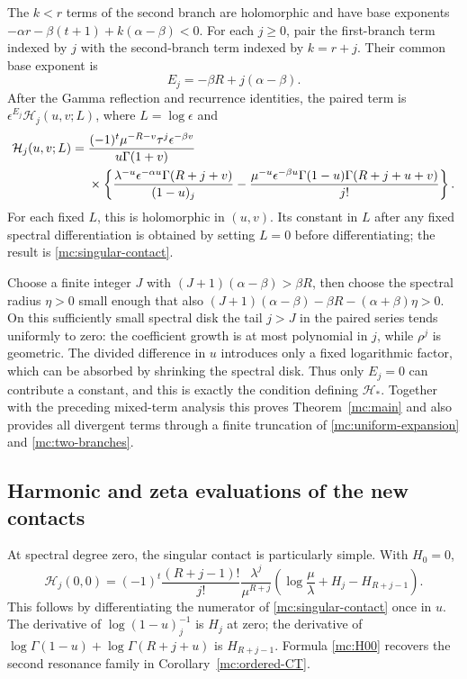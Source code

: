 The $k<r$ terms of the second branch are holomorphic and have
base exponents
$-\alpha r-\beta(t+1)+k(\alpha-\beta)<0$.
For each $j\ge0$, pair the first-branch term indexed by $j$ with
the second-branch term indexed by $k=r+j$. Their common base
exponent is
\begin{equation}\label{mc:paired-exponent}
                    E_j=-\beta R+j(\alpha-\beta).
\end{equation}
After the Gamma reflection and recurrence identities, the paired
term is $\epsilon^{E_j}\mathcal H_j(u,v;L)$, where $L=\log\epsilon$
and
\begin{align}\label{mc:H-log}
 \mathcal H_j(u,v;L)={}&
 \frac{(-1)^t\mu^{-R-v}\tau^j\epsilon^{-\beta v}}
                   {u\Gamma(1+v)}\notag\\
 &\times\left\{
 \frac{\lambda^{-u}\epsilon^{-\alpha u}\Gamma(R+j+v)}{(1-u)_j}
 -\frac{\mu^{-u}\epsilon^{-\beta u}
              \Gamma(1-u)\Gamma(R+j+u+v)}{j!}\right\}.
\end{align}
For each fixed $L$, this is holomorphic in $(u,v)$.
Its constant in $L$ after any fixed spectral differentiation is
obtained by setting $L=0$ before differentiating; the result is
\eqref{mc:singular-contact}.

Choose a finite integer $J$ with $(J+1)(\alpha-\beta)>\beta R$,
then choose the spectral radius $\eta>0$ small enough that also
$(J+1)(\alpha-\beta)-\beta R-(\alpha+\beta)\eta>0$.
On this sufficiently small spectral disk the tail $j>J$ in the
paired series tends uniformly to zero: the coefficient growth
is at most polynomial in $j$, while $\rho^j$ is geometric.
The divided difference in $u$ introduces only a fixed logarithmic
factor, which can be absorbed by shrinking the spectral disk.
Thus only $E_j=0$ can contribute a constant, and this is exactly
the condition defining $\mathcal H_*$. Together with the preceding
mixed-term analysis this proves Theorem~\ref{mc:main} and also
provides all divergent terms through a finite truncation of
\eqref{mc:uniform-expansion} and \eqref{mc:two-branches}.

\subsection{Harmonic and zeta evaluations of the new contacts}

At spectral degree zero, the singular contact is particularly
simple. With $H_0=0$,
\begin{equation}\label{mc:H00}
 \boxed{\displaystyle
 \mathcal H_j(0,0)=(-1)^t\frac{(R+j-1)!}{j!}
       \frac{\lambda^j}{\mu^{R+j}}
             \left(\log\frac\mu\lambda+H_j-H_{R+j-1}\right).}
\end{equation}
This follows by differentiating the numerator of
\eqref{mc:singular-contact} once in $u$.
The derivative of $\log(1-u)_j^{-1}$ is $H_j$ at zero;
the derivative of
$\log\Gamma(1-u)+\log\Gamma(R+j+u)$ is $H_{R+j-1}$.
Formula \eqref{mc:H00} recovers the second resonance family in
Corollary~\ref{mc:ordered-CT}.

